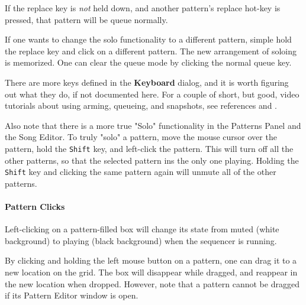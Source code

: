    If the replace key is \textsl{not} held down, and another pattern's replace
   hot-key is pressed, that pattern will be queue normally.

   If one wants to change the solo functionality to a different pattern,
   simple hold the replace key and click on a different pattern.  The new
   arrangement of soloing is memorized.
   One can clear the queue mode by clicking the normal queue key.

   There are more keys defined in the \textbf{Keyboard} dialog, and it is
   worth figuring out what they do, if not documented here.
   For a couple of short, but good, video tutorials about using arming,
   queueing, and snapshots, see references \cite{wootangent1}
   and \cite{wootangent2}.

   Also note that there is a more true "Solo" functionality in the Patterns
   Panel and the Song Editor.  To truly "solo" a pattern, move the mouse cursor
   over the pattern, hold the \texttt{Shift} key, and left-click the pattern.
   This will turn off all the other patterns, so that the selected pattern ins
   the only one playing.  Holding the \texttt{Shift} key and clicking the same
   pattern again will unmute all of the other patterns.

\paragraph{Pattern Clicks}
\label{paragraph:seq64_patterns_pattern_Clicks}

   Left-clicking on a pattern-filled box will change its state
   from muted (white background) to playing (black background) when
   the sequencer is running.

%

   By clicking and holding the left mouse button on a pattern,
   one can drag it to a new location on the grid.  The box
   will disappear while dragged, and reappear in the new location when
   dropped.  However, note that a pattern cannot be dragged if its
   Pattern Editor window is open.

